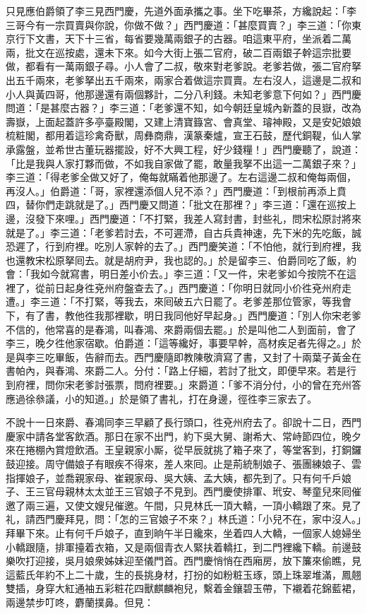 只見應伯爵領了李三見西門慶，先道外面承攜之事。坐下吃畢茶，方纔說起：「李三哥今有一宗買賣與你說，你做不做？」西門慶道：「甚麼買賣？」李三道：「你東京行下文書，天下十三省，每省要幾萬兩銀子的古器。咱這東平府，坐派着二萬兩，批文在巡按處，還未下來。如今大街上張二官府，破二百兩銀子幹這宗批要做，都看有一萬兩銀子尋。小人會了二叔，敬來對老爹說。老爹若做，張二官府拏出五千兩來，老爹拏出五千兩來，兩家合着做這宗買賣。左右沒人，這邊是二叔和小人與黃四哥，他那邊還有兩個夥計，二分八利錢。未知老爹意下何如？」西門慶問道：「是甚麼古器？」李三道：「老爹還不知，如今朝廷皇城內新蓋的艮嶽，改為壽嶽，上面起蓋許多亭臺殿閣，又建上清寶籙宮、會真堂、璿神殿，又是安妃娘娘梳粧閣，都用着這珍禽奇獸，周彝商鼎，漢篆秦爐，宣王石鼓，歷代銅鞮，仙人掌承露盤，並希世古董玩器擺設，好不大興工程，好少錢糧！」{}西門慶聽了，說道：「比是我與人家打夥而做，不如我自家做了罷，敢量我拏不出這一二萬銀子來？」{}李三道：「得老爹全做又好了，俺每就瞞着他那邊了。左右這邊二叔和俺每兩個，再沒人。」伯爵道：「哥，家裡還添個人兒不添？」西門慶道：「到根前再添上賁四，替你們走跳就是了。」西門慶又問道：「批文在那裡？」李三道：「還在巡按上邊，沒發下來哩。」西門慶道：「不打緊，我差人寫封書，封些礼，問宋松原討將來就是了。」李三道：「老爹若討去，不可遲滯，自古兵貴神速，先下米的先吃飯，誠恐遲了，行到府裡。吃別人家幹的去了。」西門慶笑道：「不怕他，就行到府裡，我也還教宋松原拏囘去。就是胡府尹，我也認的。」於是留李三、伯爵同吃了飯，約會：「我如今就寫書，明日差小价去。」李三道：「又一件，宋老爹如今按院不在這裡了，從前日起身徃兗州府盤查去了。」西門慶道：「你明日就同小价徃兗州府走遭。」李三道：「不打緊，等我去，來囘破五六日罷了。老爹差那位管家，等我會下，有了書，教他徃我那裡歇，明日我同他好早起身。」西門慶道：「別人你宋老爹不信的，他常喜的是春鴻，叫春鴻、來爵兩個去罷。」於是叫他二人到面前，會了李三，晚夕徃他家宿歇。伯爵道：「這等纔好，事要早幹，高材疾足者先得之。」於是與李三吃畢飯，告辭而去。西門慶隨即教陳敬濟寫了書，又封了十兩葉子黃金在書帕內，與春鴻、來爵二人。分付：「路上仔細，若討了批文，即便早來。若是行到府裡，問你宋老爹討張票，問府裡要。」來爵道：「爹不消分付，小的曾在充州答應過徐叅議，小的知道。」於是領了書礼，打在身邊，徑徃李三家去了。

不說十一日來爵、春鴻同李三早顧了長行頭口，徃兗州府去了。卻說十二日，西門慶家中請各堂客飲酒。那日在家不出門，約下吳大舅、謝希大、常峙節四位，晚夕來在捲棚內賞燈飲酒。王皇親家小厮，從早辰就挑了箱子來了，等堂客到，打銅鑼鼓迎接。周守備娘子有眼疾不得來，差人來囘。止是荊統制娘子、張團練娘子、雲指揮娘子，並喬親家母、崔親家母、吳大姨、孟大姨，都先到了。只有何千戶娘子、王三官母親林太太並王三官娘子不見到。{}西門慶使排軍、玳安、琴童兒來囘催邀了兩三遍，又使文嫂兒催邀。午間，只見林氏一頂大轎，一頂小轎跟了來。見了礼，請西門慶拜見，問：「怎的三官娘子不來？」林氏道：「小兒不在，家中沒人。」拜畢下來。止有何千戶娘子，直到晌午半日纔來，坐着四人大轎，一個家人媳婦坐小轎跟隨，排軍擡着衣箱，又是兩個青衣人緊扶着轎扛，到二門裡纔下轎。前邊鼓樂吹打迎接，吳月娘衆姊妹迎至儀門首。西門慶悄悄在西廂房，放下簾來偷瞧，見這藍氏年約不上二十歲，生的長挑身材，打扮的如粉粧玉琢，頭上珠翠堆滿，鳳翹雙插，身穿大紅通袖五彩粧花四獸麒麟袍兒，繫着金鑲碧玉帶，下襯着花錦藍裙，兩邊禁步叮咚，麝蘭撲鼻。但見：

